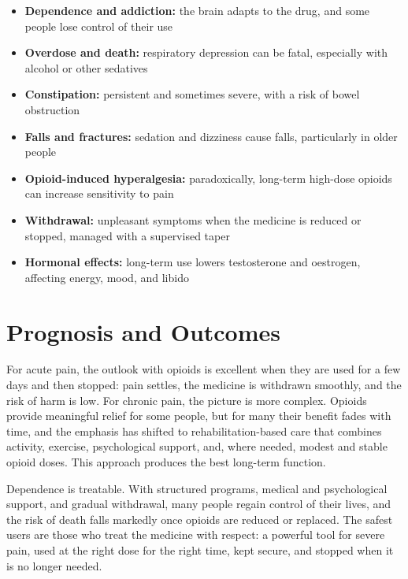 \begin{itemize}
    \item \textbf{Dependence and addiction:} the brain adapts to the drug, and some people lose control of their use
    \item \textbf{Overdose and death:} respiratory depression can be fatal, especially with alcohol or other sedatives
    \item \textbf{Constipation:} persistent and sometimes severe, with a risk of bowel obstruction
    \item \textbf{Falls and fractures:} sedation and dizziness cause falls, particularly in older people
    \item \textbf{Opioid-induced hyperalgesia:} paradoxically, long-term high-dose opioids can increase sensitivity to pain
    \item \textbf{Withdrawal:} unpleasant symptoms when the medicine is reduced or stopped, managed with a supervised taper
    \item \textbf{Hormonal effects:} long-term use lowers testosterone and oestrogen, affecting energy, mood, and libido
\end{itemize}

\section*{Prognosis and Outcomes}
For acute pain, the outlook with opioids is excellent when they are used for a few days and then stopped: pain settles, the medicine is withdrawn smoothly, and the risk of harm is low. For chronic pain, the picture is more complex. Opioids provide meaningful relief for some people, but for many their benefit fades with time, and the emphasis has shifted to rehabilitation-based care that combines activity, exercise, psychological support, and, where needed, modest and stable opioid doses. This approach produces the best long-term function.

Dependence is treatable. With structured programs, medical and psychological support, and gradual withdrawal, many people regain control of their lives, and the risk of death falls markedly once opioids are reduced or replaced. The safest users are those who treat the medicine with respect: a powerful tool for severe pain, used at the right dose for the right time, kept secure, and stopped when it is no longer needed.

